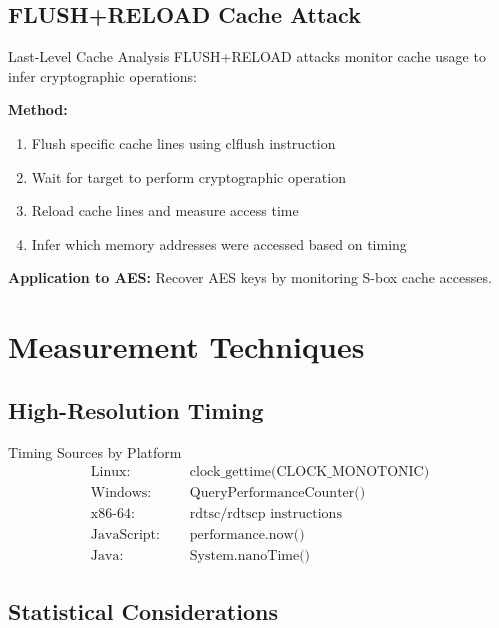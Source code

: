\documentclass[12pt,a4paper]{article}
\theoremstyle{definition}
\begin{document}
\subsection{FLUSH+RELOAD Cache Attack}

\begin{examplebox}{Last-Level Cache Analysis}
FLUSH+RELOAD attacks monitor cache usage to infer cryptographic operations:

\textbf{Method:}
\begin{enumerate}
    \item Flush specific cache lines using clflush instruction
    \item Wait for target to perform cryptographic operation
    \item Reload cache lines and measure access time
    \item Infer which memory addresses were accessed based on timing
\end{enumerate}

\textbf{Application to AES:} Recover AES keys by monitoring S-box cache accesses.
\end{examplebox}

\section{Measurement Techniques}

\subsection{High-Resolution Timing}

\begin{definitionbox}{Timing Sources by Platform}
\begin{align}
\text{Linux: } &\quad \text{clock\_gettime(CLOCK\_MONOTONIC)} \\
\text{Windows: } &\quad \text{QueryPerformanceCounter()} \\
\text{x86-64: } &\quad \text{rdtsc/rdtscp instructions} \\
\text{JavaScript: } &\quad \text{performance.now()} \\
\text{Java: } &\quad \text{System.nanoTime()}
\end{align}
\end{definitionbox}

\subsection{Statistical Considerations}
\end{document}
